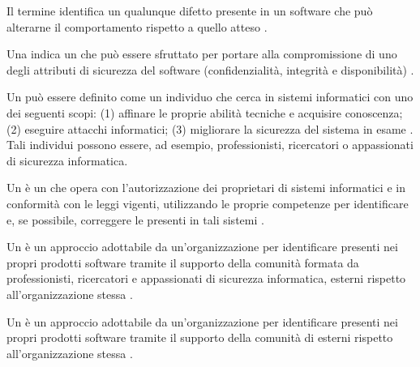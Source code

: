 \begin{definizione}[\Bug]
Il termine \bug identifica un qualunque difetto presente in un software che può alterarne il comportamento rispetto a quello atteso \cite{fryer2017bugbounty, bettini2021tdd15}.
\end{definizione}

\begin{definizione}[\Vulnerability]
Una \vulnerability indica un \bug che può essere sfruttato per portare alla compromissione di uno degli attributi di sicurezza del software (confidenzialità, integrità e disponibilità) \cite{fryer2017bugbounty, mitropoulos2017securing}.
\end{definizione}

\begin{definizione}[\Hacker]
Un \hacker può essere definito come un individuo che cerca \vulnerability in sistemi informatici con uno dei seguenti scopi: (1) affinare le proprie abilità tecniche e acquisire conoscenza; (2) eseguire attacchi informatici; (3) migliorare la sicurezza del sistema in esame \cite{oliver2020hacker}. Tali individui possono essere, ad esempio, professionisti, ricercatori o appassionati di sicurezza informatica.
\end{definizione}

\begin{definizione}[\WhiteHatHacker]
Un \whitehathacker è un \hacker che opera con l'autorizzazione dei proprietari di sistemi informatici e in conformità con le leggi vigenti, utilizzando le proprie competenze per identificare e, se possibile, correggere le \vulnerability presenti in tali sistemi \cite{walshe2020bountypaper}.
\end{definizione}

\begin{definizione}
Un \CVD è un approccio adottabile da un'organizzazione per identificare \vulnerability presenti nei propri prodotti software tramite il supporto della comunità formata da professionisti, ricercatori e appassionati di sicurezza informatica, esterni rispetto all'organizzazione stessa \cite{walshe2023bountythesis2, walshe2022cvdpaper}.
\end{definizione}

\begin{definizione}
Un \CVD è un approccio adottabile da un'organizzazione per identificare \vulnerability presenti nei propri prodotti software tramite il supporto della comunità di \whitehathacker esterni rispetto all'organizzazione stessa \cite{walshe2023bountythesis2, walshe2022cvdpaper}.
\end{definizione}

